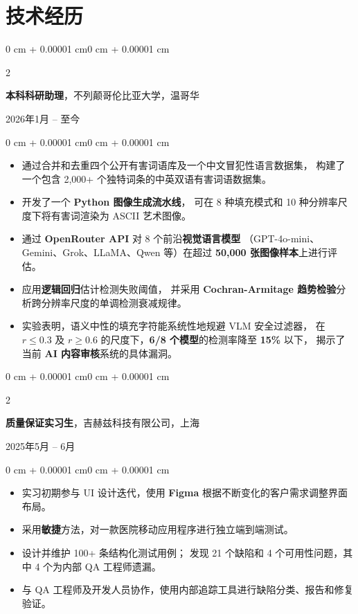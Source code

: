 \documentclass[10pt, letterpaper]{article}
\newenvironment{highlights}{
    \begin{itemize}[
        topsep=0.10 cm,
        parsep=0.10 cm,
        partopsep=0pt,
        itemsep=0pt,
        leftmargin=0 cm + 10pt
    ]
}{
    \end{itemize}
}
\newenvironment{onecolentry}{
    \begin{adjustwidth}{0 cm + 0.00001 cm}{0 cm + 0.00001 cm}
}{
    \end{adjustwidth}
}
\newenvironment{twocolentry}[2][]{
    \onecolentry
    \def\secondColumn{#2}
    \setcolumnwidth{\fill, 4.5 cm}
    \begin{paracol}{2}
}{
    \switchcolumn \raggedleft \secondColumn
    \end{paracol}
    \endonecolentry
}
\begin{document}
    \section{技术经历}

    \vspace{0.20 cm}

    \begin{twocolentry}{2026年1月 -- 至今}
        \textbf{本科科研助理}，不列颠哥伦比亚大学，温哥华
    \end{twocolentry}

    \vspace{0.10 cm}
    \begin{onecolentry}
        \begin{highlights}
            \item 通过合并和去重四个公开有害词语库及一个中文冒犯性语言数据集，
            构建了一个包含 2,000+ 个独特词条的中英双语有害词语数据集。
            \item 开发了一个 \textbf{Python 图像生成流水线}，
            可在 8 种填充模式和 10 种分辨率尺度下将有害词渲染为 ASCII 艺术图像。
            \item 通过 \textbf{OpenRouter API} 对 8 个前沿\textbf{视觉语言模型}
            （GPT-4o-mini、Gemini、Grok、LLaMA、Qwen 等）在超过 \textbf{50,000 张图像样本}上进行评估。
            \item 应用\textbf{逻辑回归}估计检测失败阈值，
            并采用 \textbf{Cochran-Armitage 趋势检验}分析跨分辨率尺度的单调检测衰减规律。
            \item 实验表明，语义中性的填充字符能系统性地规避 VLM 安全过滤器，
            在 $r \leq 0.3$ 及 $r \geq 0.6$ 的尺度下，\textbf{6/8 个模型}的检测率降至 \textbf{15\%} 以下，
            揭示了当前 \textbf{AI 内容审核}系统的具体漏洞。
        \end{highlights}
    \end{onecolentry}

    \vspace{0.20 cm}

    \begin{twocolentry}{2025年5月 -- 6月}
        \textbf{质量保证实习生}，吉赫兹科技有限公司，上海
    \end{twocolentry}

    \vspace{0.10 cm}
    \begin{onecolentry}
        \begin{highlights}
            \item 实习初期参与 UI 设计迭代，使用 \textbf{Figma} 根据不断变化的客户需求调整界面布局。
            \item 采用\textbf{敏捷}方法，对一款医院移动应用程序进行独立端到端测试。
            \item 设计并维护 100+ 条结构化测试用例；
            发现 21 个缺陷和 4 个可用性问题，其中 4 个为内部 QA 工程师遗漏。
            \item 与 QA 工程师及开发人员协作，使用内部追踪工具进行缺陷分类、报告和修复验证。
        \end{highlights}
    \end{onecolentry}
\end{document}
